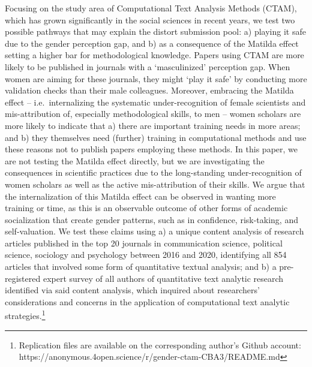 \documentclass[
]{ccr}
\begin{document}
Focusing on the study area of Computational Text Analysis Methods
(CTAM), which has grown significantly in the social sciences in recent
years, we test two possible pathways that may explain the distort
submission pool: a) playing it safe due to the gender perception gap,
and b) as a consequence of the Matilda effect setting a higher bar for
methodological knowledge. Papers using CTAM are more likely to be
published in journals with a `masculinized' perception gap. When women
are aiming for these journals, they might `play it safe' by conducting
more validation checks than their male colleagues. Moreover, embracing
the Matilda effect -- i.e.~internalizing the systematic
under-recognition of female scientists and mis-attribution of,
especially methodological skills, to men -- women scholars are more
likely to indicate that a) there are important training needs in more
areas; and b) they themselves need (further) training in computational
methods and use these reasons not to publish papers employing these
methods. In this paper, we are not testing the Matilda effect directly,
but we are investigating the consequences in scientific practices due to
the long-standing under-recognition of women scholars as well as the
active mis-attribution of their skills. We argue that the
internalization of this Matilda effect can be observed in wanting more
training or time, as this is an observable outcome of other forms of
academic socialization that create gender patterns, such as in
confidence, risk-taking, and self-valuation. We test these claims using
a) a unique content analysis of research articles published in the top
20 journals in communication science, political science, sociology and
psychology between 2016 and 2020, identifying all 854 articles that
involved some form of quantitative textual analysis; and b) a
pre-registered expert survey of all authors of quantitative text
analytic research identified via said content analysis, which inquired
about researchers' considerations and concerns in the application of
computational text analytic strategies.\footnote{Replication files are
  available on the corresponding author's Github account:
  https://anonymous.4open.science/r/gender-ctam-CBA3/README.md}
\end{document}
